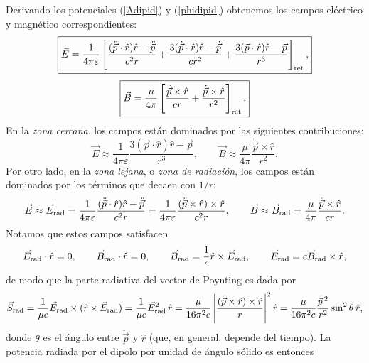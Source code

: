 Derivando los potenciales (\ref{Adipid}) y (\ref{phidipid}) obtenemos los campos eléctrico y magnético correspondientes:
\begin{equation}
 \boxed{\vec{E}=\frac{1}{4\pi\varepsilon}\left[\frac{(\ddot{\vec{p}}\cdot\hat{r})\hat{r}-\ddot{\vec{p}}}{c^2r}+\frac{3(\dot{\vec{p}}\cdot\hat{r})\hat{r}-\dot{\vec{p}}}{cr^2}+\frac{3(\vec{p}\cdot\hat{r})\hat{r}-\vec{p}}{r^3}\right]_{\rm ret},}
\end{equation}
\begin{equation}
 \boxed{\vec{B}=\frac{\mu}{4\pi}\left[\frac{\ddot{\vec{p}}\times\hat{r}}{cr}+\frac{\dot{\vec{p}}\times\hat{r}}{r^2}\right]_{\rm ret}.}
\end{equation}
En la \textit{zona cercana}, los campos están dominados por las siguientes contribuciones:
\begin{equation}
 \vec{E}\approx\frac{1}{4\pi\varepsilon}\frac{3(\vec{p}\cdot\hat{r})\hat{r}-\vec{p}}{r^3},
\qquad
 \vec{B}\approx\frac{\mu}{4\pi}\frac{\dot{\vec{p}}\times\hat{r}}{r^2}.
\end{equation}
Por otro lado, en la \textit{zona lejana}, o \textit{zona de radiación}, los campos están dominados por los términos que decaen con $1/r$:
\begin{equation}
 \vec{E}\approx\vec{E}_{\rm rad}=\frac{1}{4\pi\varepsilon}\frac{(\ddot{\vec{p}}\cdot\hat{r})\hat{r}-\ddot{\vec{p}}}{c^2r}=\frac{1}{4\pi\varepsilon}\frac{(\ddot{\vec{p}}\times\hat{r})\times\hat{r}}{c^2r}, \qquad
 \vec{B}\approx \vec{B}_{\rm rad}=\frac{\mu}{4\pi}\frac{\ddot{\vec{p}}\times\hat{r}}{cr}.
\end{equation}
Notamos que estos campos satisfacen
\begin{equation}
 \vec{E}_{\rm rad}\cdot\hat{r}=0,\qquad  \vec{B}_{\rm rad}\cdot\hat{r}=0,\qquad \vec{B}_{\rm rad}=\frac{1}{c}\hat{r}\times\vec{E}_{\rm rad}, \qquad \vec{E}_{\rm rad}=c\vec{B}_{\rm rad}\times\hat{r},
\end{equation}
de modo que la parte radiativa del vector de Poynting es dada por
\begin{equation}
\vec{S}_{\rm rad}=\frac{1}{\mu c}\vec{E}_{\rm rad}\times(\hat{r}\times\vec{E}_{\rm rad}) 
=\frac{1}{\mu c}\vec{E}_{\rm rad}^2\,\hat{r}= \frac{\mu}{16\pi^2 c}\left|\frac{(\ddot{\vec{p}}\times\hat{r})\times\hat{r}}{r}\right|^2\hat{r} 
=\frac{\mu}{16\pi^2 c}\frac{\ddot{\vec{p}}{\,}^2}{r^2}\sin^2\theta\,\hat{r},
\end{equation}
donde $\theta$ es el ángulo entre $\ddot{\vec{p}}$ y $\hat{r}$ (que, en general, depende del tiempo). La potencia radiada por el dipolo por unidad de ángulo sólido es entonces 
